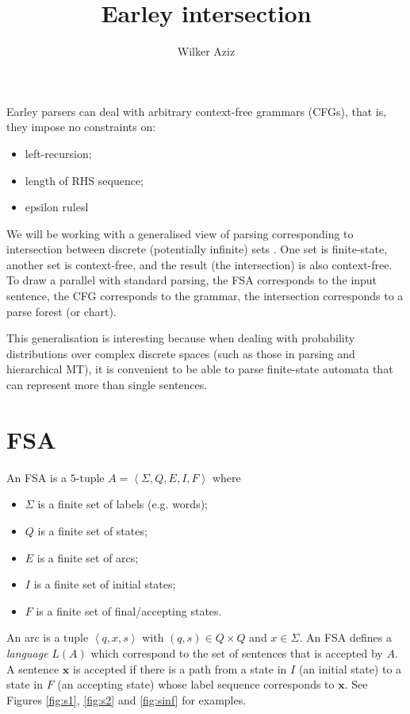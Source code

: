\documentclass[11pt]{article}
\title{Earley intersection}
\author{Wilker Aziz}
\newcommand{\angbrack}[1]{\ensuremath{\left\langle #1 \right\rangle}}
\begin{document}
\maketitle


Earley parsers \citep{Earley:1970} can deal with arbitrary context-free grammars (CFGs), that is, they impose no constraints on:
\begin{itemize}
	\item left-recursion;
	\item length of RHS sequence;
	\item epsilon rulesl
\end{itemize}

We will be working with a generalised view of parsing corresponding to intersection between discrete (potentially infinite) sets \cite{BarHillel+1961,Billott+1989}. One set is finite-state, another set is context-free, and the result (the intersection) is also context-free. 
To draw a parallel with standard parsing, the FSA corresponds to the input sentence, the CFG corresponds to the grammar, the intersection corresponds to a parse forest (or chart).

This generalisation is interesting because when dealing with probability distributions over complex discrete spaces (such as those in parsing and hierarchical MT), it is convenient to be able to parse finite-state automata that can represent more than single sentences.

\section{FSA} 

An FSA is a $5$-tuple $A = \angbrack{\Sigma, Q, E, I, F}$ where
\begin{itemize}
	\item $\Sigma$ is a finite set of labels (e.g. words);
	\item $Q$ is a finite set of states;
	\item $E$ is a finite set of arcs;
	\item $I$ is a finite set of initial states;
	\item $F$ is a finite set of final/accepting states.
\end{itemize}
An arc is a tuple $\angbrack{q, x, s}$ with $(q, s) \in Q \times Q$ and $x \in \Sigma$.
An FSA defines a \emph{language} $L(A)$ which correspond to the set of sentences that is accepted by $A$.
A sentence $\mathbf x$ is accepted if there is a path from a state in $I$ (an initial state) to a state in $F$ (an accepting state) whose label sequence corresponds to $\mathbf x$. See Figures \ref{fig:s1}, \ref{fig:s2} and \ref{fig:sinf} for examples.
\end{document}
